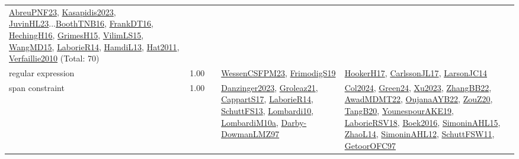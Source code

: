 {\begin{longtable}{p{3cm}r>{\raggedright\arraybackslash}p{6cm}>{\raggedright\arraybackslash}p{6cm}>{\raggedright\arraybackslash}p{8cm}}
\hyperref[detail:AbreuPNF23]{AbreuPNF23}, \hyperref[detail:Kasapidis2023]{Kasapidis2023}, \hyperref[detail:JuvinHL23]{JuvinHL23}...\hyperref[detail:BoothTNB16]{BoothTNB16}, \hyperref[detail:FrankDT16]{FrankDT16}, \hyperref[detail:HechingH16]{HechingH16}, \hyperref[detail:GrimesH15]{GrimesH15}, \hyperref[detail:VilimLS15]{VilimLS15}, \hyperref[detail:WangMD15]{WangMD15}, \hyperref[detail:LaborieR14]{LaborieR14}, \hyperref[detail:HamdiL13]{HamdiL13}, \hyperref[detail:Hat2011]{Hat2011}, \hyperref[detail:Verfaillie2010]{Verfaillie2010} (Total: 70)\\
\index{regular expression}\index{Constraints!regular expression}regular expression &  1.00 &  & \hyperref[detail:WessenCSFPM23]{WessenCSFPM23}, \hyperref[detail:FrimodigS19]{FrimodigS19} & \hyperref[detail:HookerH17]{HookerH17}, \hyperref[detail:CarlssonJL17]{CarlssonJL17}, \hyperref[detail:LarsonJC14]{LarsonJC14}\\
\index{span constraint}\index{Constraints!span constraint}span constraint &  1.00 &  & \hyperref[detail:Danzinger2023]{Danzinger2023}, \hyperref[detail:Groleaz21]{Groleaz21}, \hyperref[detail:CappartS17]{CappartS17}, \hyperref[detail:LaborieR14]{LaborieR14}, \hyperref[detail:SchuttFS13]{SchuttFS13}, \hyperref[detail:Lombardi10]{Lombardi10}, \hyperref[detail:LombardiM10a]{LombardiM10a}, \hyperref[detail:Darby-DowmanLMZ97]{Darby-DowmanLMZ97} & \hyperref[detail:Col2024]{Col2024}, \hyperref[detail:Green24]{Green24}, \hyperref[detail:Xu2023]{Xu2023}, \hyperref[detail:ZhangBB22]{ZhangBB22}, \hyperref[detail:AwadMDMT22]{AwadMDMT22}, \hyperref[detail:OujanaAYB22]{OujanaAYB22}, \hyperref[detail:ZouZ20]{ZouZ20}, \hyperref[detail:TangB20]{TangB20}, \hyperref[detail:YounespourAKE19]{YounespourAKE19}, \hyperref[detail:LaborieRSV18]{LaborieRSV18}, \hyperref[detail:Boek2016]{Boek2016}, \hyperref[detail:SimoninAHL15]{SimoninAHL15}, \hyperref[detail:ZhaoL14]{ZhaoL14}, \hyperref[detail:SimoninAHL12]{SimoninAHL12}, \hyperref[detail:SchuttFSW11]{SchuttFSW11}, \hyperref[detail:GetoorOFC97]{GetoorOFC97}\\

\end{longtable}}
